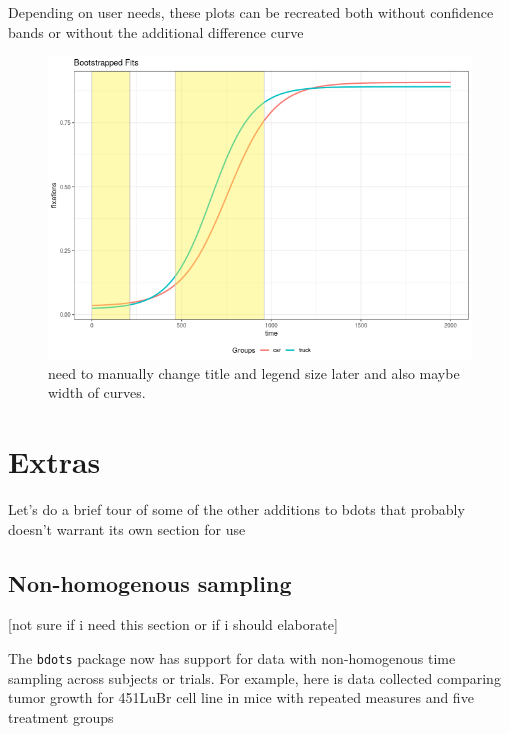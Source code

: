 \documentclass{article}
\begin{document}
Depending on user needs, these plots can be recreated both without confidence bands or without the additional difference curve

\begin{figure}[h]
\centering
\includegraphics[scale=0.45]{img/car_boot_single.png}
\caption{need to manually change title and legend size later and also maybe width of curves.}
\end{figure}




\section{Extras}

Let's do a brief tour of some of the other additions to bdots that probably doesn't warrant its own section for use

\subsection{Non-homogenous sampling}

[not sure if i need this section or if i should elaborate]

The \texttt{bdots} package now has support for data with non-homogenous time sampling across subjects or trials. For example, here is data collected comparing tumor growth for 451LuBr cell line in mice with repeated measures and five treatment groups
\end{document}

